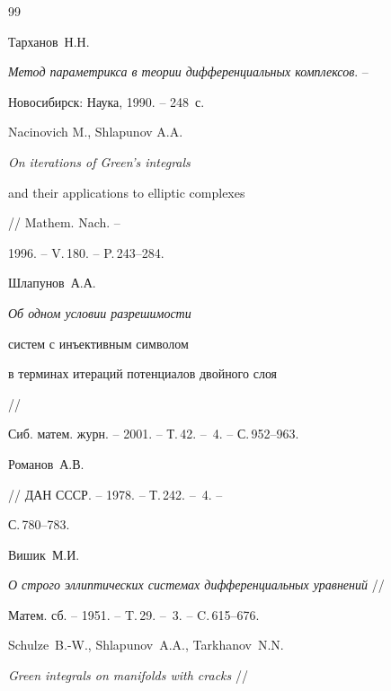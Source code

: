 \begin{thebibliography}{99}







{Тарханов~Н.Н.}


{\it Метод параметрикса в теории дифференциальных комплексов}. --


Новосибирск: Наука, 1990. -- 248~с.







{Nacinovich M., Shlapunov A.A.} {\it On iterations of Green's integrals


and their applications to elliptic complexes} // Mathem. Nach. --


1996. -- V.\,180. -- P.\,243--284.





 {Шлапунов~А.А.}


{\it Об одном условии разрешимости


систем с инъективным символом


в терминах итераций потенциалов двойного слоя} //


Сиб. матем. журн. -- 2001. -- Т.\,42. -- \No\,4. -- С.\,952--963.







{Романов~А.В.}


 // ДАН СССР. -- 1978. -- Т.\,242. -- \No\,4. --


С.\,780--783.







{Вишик~М.И.}


{\it О строго эллиптических системах дифференциальных уравнений} //


Матем. сб. -- 1951. -- T.\,29. -- \No\,3. -- C.\,615--676.





 {Schulze~B.-W., Shlapunov~A.A., Tarkhanov~N.N.}


{\it Green integrals on manifolds with cracks} //



\end{thebibliography}
